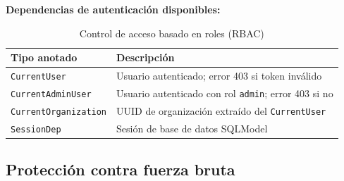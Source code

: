 \begin{Shaded}
\begin{Highlighting}[]
\NormalTok{(}\OperatorTok{=}\NormalTok{[Depends(require\_role(}\NormalTok{))])}
\OperatorTok{{-}\textgreater{}}

\NormalTok{(}\OperatorTok{=}\NormalTok{[Depends(require\_role(}\NormalTok{, }\NormalTok{))])}
\OperatorTok{{-}\textgreater{}}
\end{Highlighting}
\end{Shaded}

\textbf{Dependencias de autenticación disponibles:}

\begin{longtable}[]{@{}
  >{\raggedright\arraybackslash}p{}
  >{\raggedright\arraybackslash}p{}@{}}
\caption[Control de acceso basado en roles (RBAC)]{Control de acceso basado en roles (RBAC)}\tabularnewline
\toprule\noalign{}
\begin{minipage}[b]{\linewidth}\raggedright
Tipo anotado
\end{minipage} & \begin{minipage}[b]{\linewidth}\raggedright
Descripción
\end{minipage} \\
\midrule\noalign{}
\endhead
\bottomrule\noalign{}
\endlastfoot
\texttt{CurrentUser} & Usuario autenticado; error 403 si token inválido \\
\texttt{CurrentAdminUser} & Usuario autenticado con rol \texttt{admin}; error 403 si no \\
\texttt{CurrentOrganization} & UUID de organización extraído del \texttt{CurrentUser} \\
\texttt{SessionDep} & Sesión de base de datos SQLModel \\
\end{longtable}

\subsection{Protección contra fuerza bruta}\label{protecciuxf3n-contra-fuerza-bruta}

